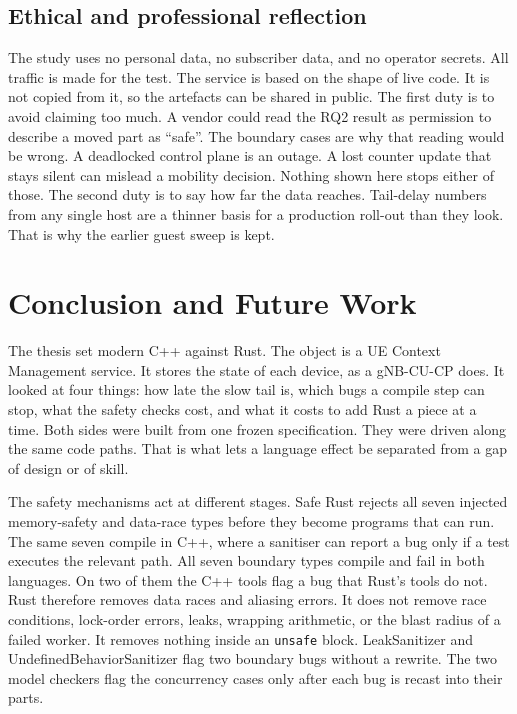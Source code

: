 \documentclass[english,oneside,a4paper,censored,csm,software-track-2020]{HYthesisML}
\begin{document}
\section{Ethical and professional reflection}
The study uses no personal data, no subscriber data, and no operator secrets.
All traffic is made for the test.
The service is based on the shape of live code. It is not copied from it, so the artefacts can be shared in public.
The first duty is to avoid claiming too much.
A vendor could read the RQ2 result as permission to describe a moved part as ``safe''.
The boundary cases are why that reading would be wrong.
A deadlocked control plane is an outage.
A lost counter update that stays silent can mislead a mobility decision.
Nothing shown here stops either of those.
The second duty is to say how far the data reaches.
Tail-delay numbers from any single host are a thinner basis for a production roll-out than they look.
That is why the earlier guest sweep is kept.

\chapter{Conclusion and Future Work\label{chapter:conclusions}}

The thesis set modern C++ against Rust.
The object is a UE Context Management service.
It stores the state of each device, as a gNB-CU-CP does.
It looked at four things: how late the slow tail is, which bugs a compile step can stop, what the safety checks cost, and what it costs to add Rust a piece at a time.
Both sides were built from one frozen specification.
They were driven along the same code paths.
That is what lets a language effect be separated from a gap of design or of skill.

The safety mechanisms act at different stages.
Safe Rust rejects all seven injected memory-safety and data-race types before they become programs that can run.
The same seven compile in C++, where a sanitiser can report a bug only if a test executes the relevant path.
All seven boundary types compile and fail in both languages.
On two of them the C++ tools flag a bug that Rust's tools do not.
Rust therefore removes data races and aliasing errors.
It does not remove race conditions, lock-order errors, leaks, wrapping arithmetic, or the blast radius of a failed worker.
It removes nothing inside an \texttt{unsafe} block.
LeakSanitizer and UndefinedBehaviorSanitizer flag two boundary bugs without a rewrite.
The two model checkers flag the concurrency cases only after each bug is recast into their parts.
\end{document}
